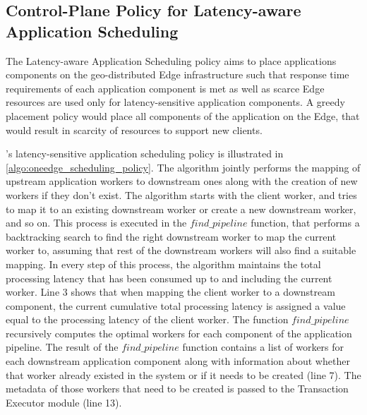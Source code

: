 \subsection{Control-Plane Policy for Latency-aware Application Scheduling}
\label{sec:oneedge_latency_aware_placement}
The Latency-aware Application Scheduling policy aims to place applications components on the geo-distributed Edge infrastructure such that response time requirements of each application component is met as well as scarce Edge resources are used only for latency-sensitive application components. A greedy placement policy would place all components of the application on the Edge, that would result in scarcity of resources to support new clients.
\par \oneedge{}'s latency-sensitive application scheduling policy is illustrated in \cref{algo:oneedge_scheduling_policy}. The algorithm jointly performs the mapping of upstream application workers to downstream ones along with the creation of new workers if they don't exist. The algorithm starts with the client worker, and tries to map it to an existing downstream worker or create a new downstream worker, and so on. This process is executed in the $find\_pipeline$ function, that performs a backtracking search to find the right downstream worker to map the current worker to, assuming that rest of the downstream workers will also find a suitable mapping. In every step of this process, the algorithm maintains the total processing latency that has been consumed
up to and including the current worker. Line 3 shows that when mapping the client worker to a downstream component, the current cumulative total processing latency is assigned a value equal to the processing latency of the client worker. The function $find\_pipeline$ recursively computes the optimal workers for each component of the application pipeline. The result of the $find\_pipeline$ function contains a list of workers for each downstream application component along with information about whether that worker already existed in the system or if it needs to be created (line 7). The metadata of those workers that need to be created is passed to the Transaction Executor module (line 13).

